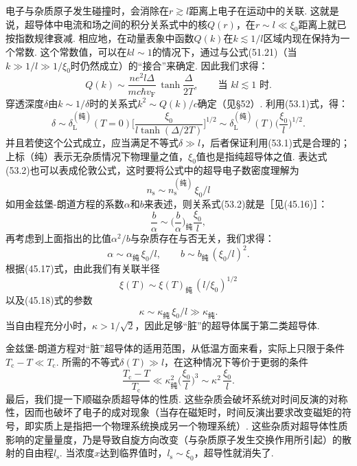 电子与杂质原子发生碰撞时，会消除在$r\gtrsim l$距离上电子在运动中的关联. 这就是说，超导体中电流和场之间的积分关系式中的核$Q(r)$，在$r\sim l\ll\xi_0$距离上就已按指数规律衰减. 相应地，在动量表象中函数$Q(k)$在$k\lesssim1/l$区域内现在保持为一个常数. 这个常数值，可以在$kl\sim1$的情况下，通过与公式(51.21)（当$k\gg1/l\gg1/\xi_0$时仍然成立）的“接合”来确定. 因此我们求得：
\begin{equation}
Q(k)\sim\frac{ne^2l\Delta}{mc\hbar v_{\mathrm{F}}}\,
\tanh\frac{\Delta}{2T},\qquad \text{当 }kl\lesssim1\text{ 时.}
\end{equation}
穿透深度$\delta$由$k\sim1/\delta$时的关系式$k^2\sim Q(k)/c$确定（见§52）. 利用(53.1)式，得：
\begin{equation}
\delta\sim\delta_{\mathrm{L}}^{(\text{纯})}(T=0)
\biggl[\frac{\xi_0}{l\tanh(\Delta/2T)}\biggr]^{\!1/2}
\sim\delta_{\mathrm{L}}^{(\text{纯})}(T)\biggl(\frac{\xi_0}{l}\biggr)^{\!1/2}.
\end{equation}
并且若使这个公式成立，应当满足不等式$\delta\gg l$，后者保证利用(53.1)式是合理的；上标（纯）表示无杂质情况下物理量之值，$\xi_0$值也是指纯超导体之值. 表达式(53.2)也可以表成伦敦公式，这时要将公式中的超导电子数密度理解为
\begin{equation}
n_{\mathrm{s}}\sim n_{\mathrm{s}}^{(\text{纯})}\,\xi_0/l
\end{equation}
如用金兹堡-朗道方程的系数$\alpha$和$b$来表述，则关系式(53.2)就是［见(45.16)］：
\begin{equation*}
\frac{b}{\alpha}\sim\biggl(\frac{b}{\alpha}\biggr)_{\!\text{纯}}\frac{\xi_0}{l},
\end{equation*}
再考虑到上面指出的比值$\alpha^2/b$与杂质存在与否无关，我们求得：
\begin{equation}
\alpha\sim\alpha_{\text{纯}}\,\xi_0/l,\qquad
b\sim b_{\text{纯}}\,(\xi_0/l)^2.
\end{equation}
根据(45.17)式，由此我们有关联半径
\begin{equation}
\xi(T)\sim\xi(T)_{\text{纯}}\,(l/\xi_0)^{1/2}
\end{equation}
以及(45.18)式的参数
\begin{equation}
\kappa\sim\kappa_{\text{纯}}\,\xi_0/l\gg\kappa_{\text{纯}}.
\end{equation}
当自由程充分小时，$\kappa>1/\sqrt{2}$，因此足够“脏”的超导体属于第二类超导体.

金兹堡-朗道方程对“脏”超导体的适用范围，从低温方面来看，实际上只限于条件$T_{\mathrm{c}}-T\ll T_{\mathrm{c}}$. 所需的不等式$\delta(T)\gg l$，在这种情况下等价于更弱的条件
\begin{equation*}
\frac{T_{\mathrm{c}}-T}{T_{\mathrm{c}}}\ll
\kappa_{\text{纯}}^2\biggl(\frac{\xi_0}{l}\biggr)^{\!3}\sim\kappa^2\,\frac{\xi_0}{l}.
\end{equation*}
最后，我们提一下顺磁杂质超导体的性质. 这些杂质会破坏系统对时间反演的对称性，因而也破坏了电子的成对现象（当存在磁矩时，时间反演出要求改变磁矩的符号，即实质上是指把一个物理系统换成另一个物理系统）. 这些杂质对超导体性质影响的定量量度，乃是导致自旋方向改变（与杂质原子发生交换作用所引起）的散射的自由程$l_{\mathrm{s}}$. 当浓度$x$达到临界值时，$l_{\mathrm{s}}\sim\xi_0$，超导性就消失了.

